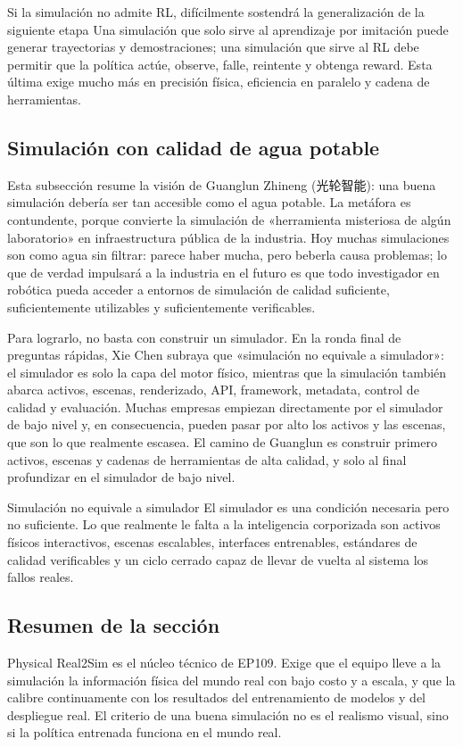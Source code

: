 \begin{warningbox}{Si la simulación no admite RL, difícilmente sostendrá la generalización de la siguiente etapa}
Una simulación que solo sirve al aprendizaje por imitación puede generar trayectorias y demostraciones; una simulación que sirve al RL debe permitir que la política actúe, observe, falle, reintente y obtenga reward. Esta última exige mucho más en precisión física, eficiencia en paralelo y cadena de herramientas.
\end{warningbox}

\subsection{Simulación con calidad de agua potable}

Esta subsección resume la visión de Guanglun Zhineng (光轮智能): una buena simulación debería ser tan accesible como el agua potable. La metáfora es contundente, porque convierte la simulación de «herramienta misteriosa de algún laboratorio» en infraestructura pública de la industria. Hoy muchas simulaciones son como agua sin filtrar: parece haber mucha, pero beberla causa problemas; lo que de verdad impulsará a la industria en el futuro es que todo investigador en robótica pueda acceder a entornos de simulación de calidad suficiente, suficientemente utilizables y suficientemente verificables.

Para lograrlo, no basta con construir un simulador. En la ronda final de preguntas rápidas, Xie Chen subraya que «simulación no equivale a simulador»: el simulador es solo la capa del motor físico, mientras que la simulación también abarca activos, escenas, renderizado, API, framework, metadata, control de calidad y evaluación. Muchas empresas empiezan directamente por el simulador de bajo nivel y, en consecuencia, pueden pasar por alto los activos y las escenas, que son lo que realmente escasea. El camino de Guanglun es construir primero activos, escenas y cadenas de herramientas de alta calidad, y solo al final profundizar en el simulador de bajo nivel.

\begin{importantbox}{Simulación no equivale a simulador}
El simulador es una condición necesaria pero no suficiente. Lo que realmente le falta a la inteligencia corporizada son activos físicos interactivos, escenas escalables, interfaces entrenables, estándares de calidad verificables y un ciclo cerrado capaz de llevar de vuelta al sistema los fallos reales.
\end{importantbox}

\subsection{Resumen de la sección}

Physical Real2Sim es el núcleo técnico de EP109. Exige que el equipo lleve a la simulación la información física del mundo real con bajo costo y a escala, y que la calibre continuamente con los resultados del entrenamiento de modelos y del despliegue real. El criterio de una buena simulación no es el realismo visual, sino si la política entrenada funciona en el mundo real.
